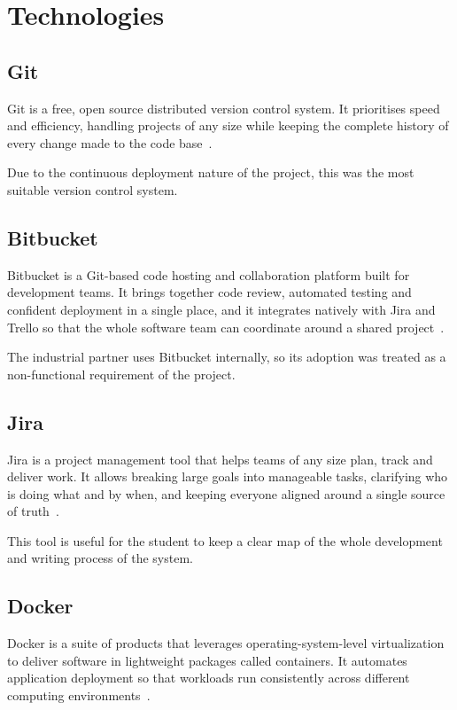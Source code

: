 \chapter{Technologies}
\label{chap:technologies}
\section{Git}
Git is a free, open source distributed version control system. It prioritises speed and efficiency, handling projects of any size while keeping the complete history of every change made to the code base~\cite{git}.

Due to the continuous deployment nature of the project, this was the most suitable version control system.

\section{Bitbucket}
Bitbucket is a Git-based code hosting and collaboration platform built for development teams. It brings together code review, automated testing and confident deployment in a single place, and it integrates natively with Jira and Trello so that the whole software team can coordinate around a shared project~\cite{bitbucket}.

The industrial partner uses Bitbucket internally, so its adoption was treated as a non-functional requirement of the project.

\section{Jira}
Jira is a project management tool that helps teams of any size plan, track and deliver work. It allows breaking large goals into manageable tasks, clarifying who is doing what and by when, and keeping everyone aligned around a single source of truth~\cite{jira}.

This tool is useful for the student to keep a clear map of the whole development and writing process of the system.

\section{Docker}
Docker is a suite of products that leverages operating-system-level virtualization to deliver software in lightweight packages called containers. It automates application deployment so that workloads run consistently across different computing environments~\cite{docker}.

